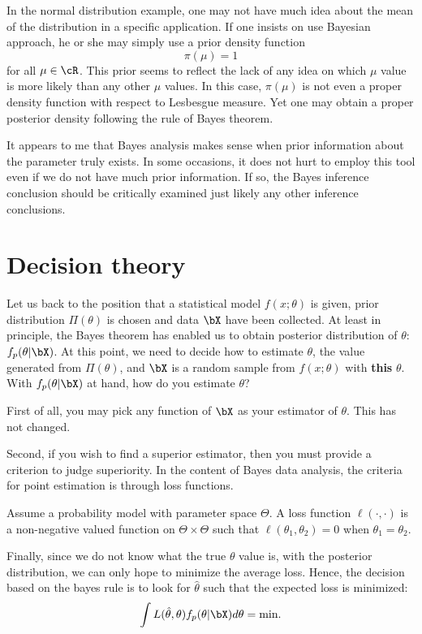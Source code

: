 In the normal distribution example, one may not have much idea about
the mean of the distribution in a specific application. If one insists on
use Bayesian approach, he or she may simply use a prior density
function
\[
\pi(\mu) = 1
\]
for all $\mu \in \cR$. This prior seems to reflect the lack of any
idea on which $\mu$ value is more likely than any other $\mu$ values.
In this case, $\pi(\mu)$ is not even a proper density
function with respect to Lesbesgue measure. Yet one may obtain a proper
posterior density following the rule of Bayes theorem. 

It appears to me that Bayes analysis makes sense when prior information
about the parameter truly exists. In some occasions, it does not hurt to
employ this tool even if we do not have much prior information. If so,
the Bayes inference conclusion should be critically examined just likely any
other inference conclusions. 

\section{Decision theory}
Let us back to the position that a statistical model
$f(x; \theta)$ is given, prior distribution $\Pi(\theta)$ is chosen
and data $\bX$ have been collected. At least in principle,
the Bayes theorem has enabled us to obtain posterior
distribution of $\theta$: $f_p(\theta|\bX)$. At this point, 
we need to decide how to estimate $\theta$, 
the value generated from $\Pi(\theta)$, and $\bX$ is a 
random sample from $f(x; \theta)$ with {\bf this} $\theta$.
With $f_p(\theta|\bX)$ at hand, how do you estimate $\theta$?

First of all, you may pick any function of $\bX$ as your estimator
of $\theta$. This has not changed.

Second, if you wish to find a superior estimator, then you must
provide a criterion to judge superiority. In the content of Bayes
data analysis, the criteria for point estimation is through loss
functions. 

\begin{defi}
Assume a probability model with parameter space $\Theta$.
A loss function $\ell(\cdot, \cdot)$ is a non-negative valued
function on $\Theta \times \Theta$ such that
$\ell(\theta_1, \theta_2) = 0$ when $\theta_1 = \theta_2$.
\end{defi}

Finally, since we do not know what the true $\theta$ value is,
with the posterior distribution, we can only hope to minimize
the average loss. Hence, the decision based on the bayes rule 
is to look for $\hat \theta$ such that the expected loss is minimized:
\[
\int L(\hat \theta, \theta) f_p(\theta| \bX) d\theta = \mbox{min}.
\]

